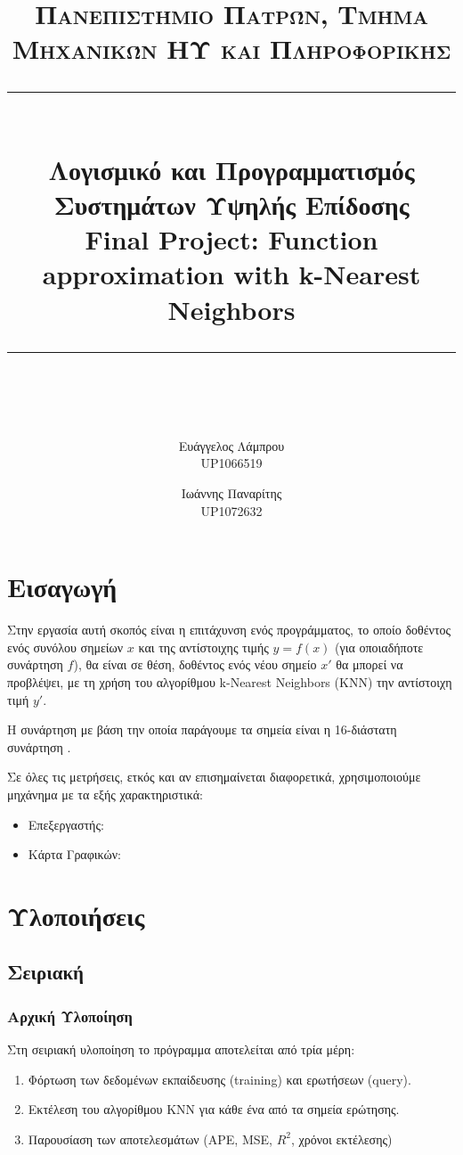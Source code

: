 \documentclass[11pt]{scrartcl} %
\title{	
	\normalfont\normalsize
	\textsc{Πανεπιστήμιο Πατρών, Τμήμα Μηχανικών ΗΥ και Πληροφορικής}\\ %
	\vspace{25pt} %
	\rule{\linewidth}{0.5pt}\\ %
	\vspace{20pt} %
    {\Large Λογισμικό και Προγραμματισμός Συστημάτων Υψηλής Επίδοσης \\ \textbf{Final Project:} Function approximation with k-Nearest Neighbors}\\ %
	\vspace{12pt} %
	\rule{\linewidth}{2pt}\\ %
	\vspace{12pt} %
}
\author{Ευάγγελος Λάμπρου \\UP1066519 \and Ιωάννης Παναρίτης \\UP1072632} %
\date{} %
\begin{document}
\maketitle 
\tableofcontents

\section{Εισαγωγή}

Στην εργασία αυτή σκοπός είναι η επιτάχυνση ενός προγράμματος, το οποίο
δοθέντος ενός συνόλου σημείων $x$ και της αντίστοιχης τιμής $y = f(x)$ (για οποιαδήποτε συνάρτηση $f$), 
θα είναι σε θέση, δοθέντος ενός νέου σημείο $x'$ θα μπορεί να προβλέψει, με τη χρήση του αλγορίθμου 
k-Nearest Neighbors (KNN) την αντίστοιχη τιμή $y'$.

Η συνάρτηση με βάση την οποία παράγουμε τα σημεία είναι η 16-διάστατη συνάρτηση .

Σε όλες τις μετρήσεις, ετκός και αν επισημαίνεται διαφορετικά, χρησιμοποιούμε μηχάνημα με τα εξής χαρακτηριστικά:
\begin{itemize}
    \item Επεξεργαστής: 
    \item Κάρτα Γραφικών: 
\end{itemize}

\section{Υλοποιήσεις}

\subsection{Σειριακή}

\subsubsection{Αρχική Υλοποίηση}

Στη σειριακή υλοποίηση το πρόγραμμα αποτελείται από τρία μέρη: 

\begin{enumerate}
    \item Φόρτωση των δεδομένων εκπαίδευσης (training) και ερωτήσεων (query).
    \item Εκτέλεση του αλγορίθμου KNN για κάθε ένα από τα σημεία ερώτησης.
    \item Παρουσίαση των αποτελεσμάτων (APE, MSE, $R^2$, χρόνοι εκτέλεσης)
\end{enumerate}
\end{document}
